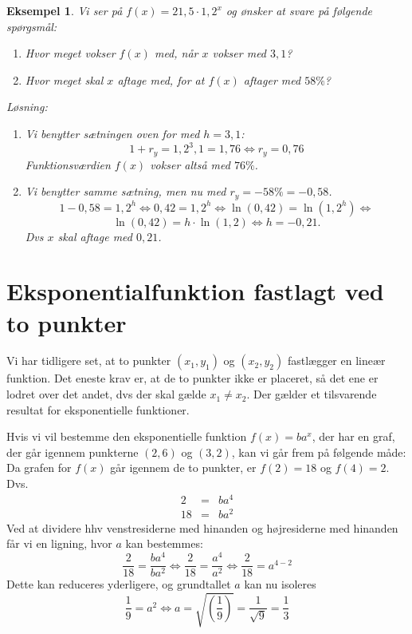 \documentclass[12pt,oneside,a4paper]{article}
\newcommand{\bas}{\begin{eqnarray*}}
\newcommand{\eas}{\end{eqnarray*}}
\newtheorem{eks}[thm]{Eksempel}
\begin{document}
\begin{eks}
    Vi ser på $f(x) = 21,5 \cdot 1,2^x$ og ønsker at svare på følgende spørgsmål:
    \begin{enumerate}
        \item Hvor meget vokser $f(x)$ med, når $x$ vokser med $3,1$?
        \item Hvor meget skal $x$ aftage med, for at $f(x)$ aftager med $58\%$?
    \end{enumerate}

    Løsning:
    \begin{enumerate}
        \item Vi benytter sætningen oven for med $h=3,1$:
            $$
            1+r_y = 1,2^3,1 = 1,76 \Leftrightarrow r_y = 0,76
            $$
            Funktionsværdien $f(x)$ vokser altså med $76\%$.
        \item Vi benytter samme sætning, men nu med $r_y = -58\% = -0,58$.
            $$
            1-0,58 = 1,2^h \Leftrightarrow 0,42 = 1,2^h \Leftrightarrow \ln(0,42) = \ln(1,2^h) \Leftrightarrow
            $$
            $$
            \ln(0,42) = h\cdot \ln(1,2) \Leftrightarrow h = -0,21.
            $$
            Dvs $x$ skal aftage med $0,21$.
    \end{enumerate}
\end{eks}

\section{Eksponentialfunktion fastlagt ved to punkter}
Vi har tidligere set, at to punkter $(x_1,y_1)$ og $(x_2, y_2)$ fastlægger en
lineær funktion. Det eneste krav er, at de to punkter ikke er placeret, så det
ene er lodret over det andet, dvs der skal gælde $x_1 \neq x_2$. Der gælder et
tilsvarende resultat for eksponentielle funktioner.

Hvis vi vil bestemme den eksponentielle funktion $f(x) = ba^x$, der har en
graf, der går igennem punkterne $(2, 6)$ og $(3, 2)$, kan vi går frem på
følgende måde:
Da grafen for $f(x)$ går igennem de to punkter, er $f(2) = 18$ og $f(4) = 2$. Dvs.
\bas
2 &=& b a^4 \\
18 &=& b a^2 
\eas
Ved at dividere hhv venstresiderne med hinanden og højresiderne med hinanden får vi en ligning,
hvor $a$ kan bestemmes:
$$
\frac{2}{18} = \frac{b a^4}{b a^2} \Leftrightarrow 
\frac{2}{18} = \frac{a^4}{a^2} \Leftrightarrow 
\frac{2}{18} = a^{4-2} 
$$
Dette kan reduceres yderligere, og grundtallet $a$ kan nu isoleres
$$
\frac{1}{9} = a^2 \Leftrightarrow a = \sqrt{\left(\frac{1}{9}\right)} = \frac{1}{\sqrt{9}} = \frac{1}{3}
$$
\end{document}
